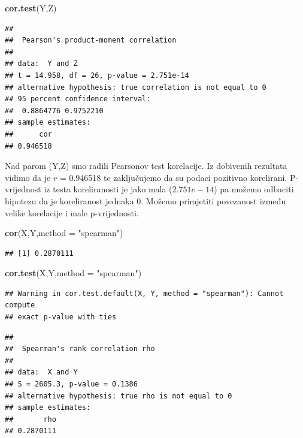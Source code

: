 \documentclass[]{article}
\newenvironment{Shaded}{\begin{snugshade}}{\end{snugshade}}
\newcommand{\KeywordTok}[1]{\textcolor[rgb]{0.13,0.29,0.53}{\textbf{{#1}}}}
\newcommand{\DataTypeTok}[1]{\textcolor[rgb]{0.13,0.29,0.53}{{#1}}}
\newcommand{\StringTok}[1]{\textcolor[rgb]{0.31,0.60,0.02}{{#1}}}
\newcommand{\NormalTok}[1]{{#1}}
\begin{document}
\begin{Shaded}
\begin{Highlighting}[]
\KeywordTok{cor.test}\NormalTok{(Y,Z)}
\end{Highlighting}
\end{Shaded}

\begin{verbatim}
## 
##  Pearson's product-moment correlation
## 
## data:  Y and Z
## t = 14.958, df = 26, p-value = 2.751e-14
## alternative hypothesis: true correlation is not equal to 0
## 95 percent confidence interval:
##  0.8864776 0.9752210
## sample estimates:
##      cor 
## 0.946518
\end{verbatim}

Nad parom (Y,Z) smo radili Pearsonov test korelacije. Iz dobivenih
rezultata vidimo da je \(r\) = 0.946518 te zaključujemo da su podaci
pozitivno korelirani. P-vrijednost iz testa koreliranosti je jako mala
(\(2.751e-14\)) pa možemo odbaciti hipotezu da je koreliranost jednaka
0. Možemo primjetiti povezanost između velike korelacije i male
p-vrijednosti.

\begin{Shaded}
\begin{Highlighting}[]
\KeywordTok{cor}\NormalTok{(X,Y,}\DataTypeTok{method =} \StringTok{"spearman"}\NormalTok{)}
\end{Highlighting}
\end{Shaded}

\begin{verbatim}
## [1] 0.2870111
\end{verbatim}

\begin{Shaded}
\begin{Highlighting}[]
\KeywordTok{cor.test}\NormalTok{(X,Y,}\DataTypeTok{method =} \StringTok{"spearman"}\NormalTok{)}
\end{Highlighting}
\end{Shaded}

\begin{verbatim}
## Warning in cor.test.default(X, Y, method = "spearman"): Cannot compute
## exact p-value with ties
\end{verbatim}

\begin{verbatim}
## 
##  Spearman's rank correlation rho
## 
## data:  X and Y
## S = 2605.3, p-value = 0.1386
## alternative hypothesis: true rho is not equal to 0
## sample estimates:
##       rho 
## 0.2870111
\end{verbatim}
\end{document}
